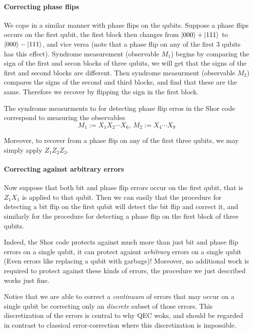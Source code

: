 \documentclass[11pt,a4paper]{article}
\theoremstyle{definition}
\theoremstyle{plain}
\theoremstyle{remark}
\begin{document}
\paragraph{Correcting phase flips}
We cope in a similar manner with phase flips on the qubits. Suppose a phase flips occurs on the first qubit, the first block then changes from $\ket{000} + \ket{111}$ 
to $\ket{000} - \ket{111}$, and vice versa (note that a phase flip on any of the first 3 qubits has this effect). Syndrome measurement (observable $M_1$) begins by comparing the sign of 
the first and secon blocks of three qubits, we will get that the signs of the first and second blocks are different. Then syndrome measurment (observable $M_2$) compares the signs of the second 
and third blocks, and find that these are the same. Therefore we recover by flipping the sign in the first block. 

The syndrome measurments to for detecting phase flip erros in the Shor code correspond to measuring the observables 
$$M_1 := X_1 X_2 \cdots X_6, \, M_2 := X_4 \cdots X_9$$

Moreover, to recover from a phase flip on any of the first three qubits, we may simply apply $Z_1 Z_2 Z_3$. 

\paragraph{Correcting against arbitrary errors} 
Now suppose that both bit and phase flip errors occur on the first qubit,  that is $Z_1 X_1$ is applied to that qubit. 
Then we can easily that the procedure for detecting a bit flip on the first qubit will detect the bit flip and correct it, and similarly for the
procedure for detecting a phase flip on the first block of three qubits. 

Indeed, the Shor code protects against much more than just bit and phase flip errors on a single qubit, it can protect agaisnt \emph{arbitrary} errors 
on a single qubit (Even errors like replacing a qubit with garbage)! Moreover, no additional work is required to protect against these kinds of errors, 
the procedure we just described works just fine. 

Notice that we are able to correct a \emph{continuum} of errors that may occur on a single qubit be correcting only an \emph{discrete} subset of those errors.
This discretization of the errors is central to why QEC woks, and should be regarded in contrast to classical error-correction where this discretization is impossible. 
\end{document}
